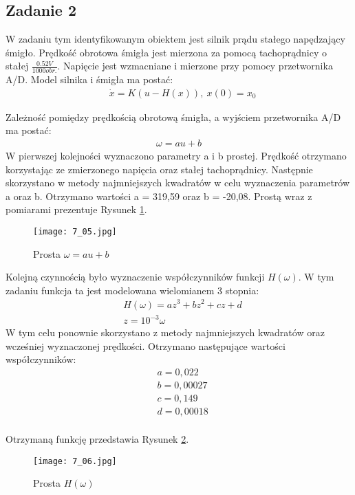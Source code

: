 \documentclass[a4paper,15pt]{article}
\begin{document}
\subsection{Zadanie 2 }

W zadaniu tym identyfikowanym obiektem jest silnik prądu stałego napędzający śmigło. Prędkość obrotowa śmigła jest mierzona za pomocą tachoprądnicy o stałej \( \frac{0.52V}{1000obr.} \). Napięcie jest wzmacniane i mierzone przy pomocy przetwornika A/D. Model silnika i śmigła ma postać:
\begin{align*}
& \dot{x}=K(u-H(x)), \ x(0)=x_0
\end{align*}

Zależność pomiędzy prędkością obrotową śmigła, a wyjściem przetwornika A/D ma postać:
\begin{align*}
\omega = au + b
\end{align*}
W pierwszej kolejności wyznaczono parametry a i b prostej. Prędkość otrzymano korzystając ze zmierzonego napięcia oraz stałej tachoprądnicy. Następnie skorzystano w metody najmniejszych kwadratów w celu wyznaczenia parametrów a oraz b. Otrzymano wartości a = 319,59 oraz b = -20,08. Prostą wraz z pomiarami prezentuje Rysunek \ref{fig:7_05}.
\begin{figure}[H]
\centerline{\texttt{[image: 7\_05.jpg]}}
\centering
\caption{Prosta \( \omega = au + b \)}
\label{fig:7_05}
\end{figure}

Kolejną czynnością było wyznaczenie współczynników funkcji \( H(\omega) \). W tym zadaniu funkcja ta jest modelowana wielomianem 3 stopnia:
\begin{align*}
& H(\omega)=az^3+bz^2+cz+d \\
& z = 10^{-3}\omega
\end{align*}
W tym celu ponownie skorzystano z metody najmniejszych kwadratów oraz wcześniej wyznaczonej prędkości. Otrzymano następujące wartości współczynników:
\begin{align*}
& a = 0,022 \\
& b = 0,00027 \\
& c = 0,149 \\
& d = 0,00018 \\
\end{align*}

Otrzymaną funkcję przedstawia Rysunek \ref{fig:7_06}.
\begin{figure}[H]
\centerline{\texttt{[image: 7\_06.jpg]}}
\centering
\caption{Prosta \( H(\omega) \)}
\label{fig:7_06}
\end{figure}
\end{document}
